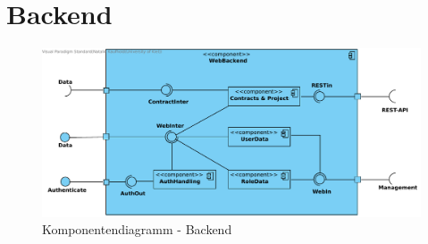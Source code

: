 

\section{Backend}

\begin{figure}[H]
	\centering
	\includegraphics[width=\linewidth]{img/diagrams/cp_backend.pdf}		
	\caption{Komponentendiagramm - Backend}
	\label{fig:komponentendiagramm-backend}
\end{figure}

\newpage

